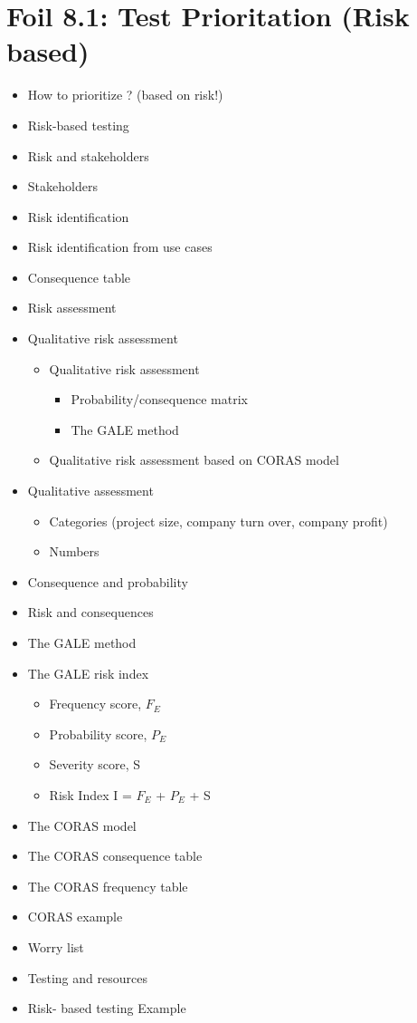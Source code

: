 
	\section{Foil 8.1: Test Prioritation (Risk based)}
		\begin{itemize}
			\item How to prioritize ? (based on risk!)
			\item Risk-based testing
			\item Risk and stakeholders
			\item Stakeholders
			\item Risk identification
			\item Risk identification from use cases
			\item Consequence table
			\item Risk assessment
			\item Qualitative risk assessment
				\begin{itemize}
					\item Qualitative risk assessment
						\begin{itemize}
							\item Probability/consequence matrix
							\item The GALE method
						\end{itemize}
					\item Qualitative risk assessment based on CORAS model
				\end{itemize}
			\item Qualitative assessment
				\begin{itemize}
					\item Categories (project size, company turn over, company profit)
					\item Numbers 
				\end{itemize}
			\item Consequence and probability
			\item Risk and consequences
			\item The GALE method
			\item The GALE risk index
				\begin{itemize}
					\item Frequency score, $F_{E}$
					\item Probability score, $P_{E}$
					\item Severity score, S
					\item Risk Index I = $F_{E}$ + $P_{E}$ + S
				\end{itemize}
			\item The CORAS model
			\item The CORAS consequence table
			\item The CORAS frequency table
			\item CORAS example
			\item Worry list
			\item Testing and resources
			\item Risk- based testing Example
		\end{itemize}

